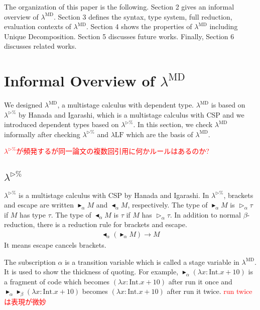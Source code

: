 \documentclass[runningheads]{llncs}
\newcommand{\red}[1]{\textcolor{red}{#1 }}
\newcommand{\LTP}{$\lambda^{\triangleright\%}$\xspace}
\newcommand{\LMD}{$\lambda^{\textrm{MD}}$\xspace}
\newcommand{\LLF}{$\lambda\textrm{LF}$\xspace}
\newcommand{\TW}{\triangleright}
\newcommand{\TB}{\blacktriangleright}
\newcommand{\TBL}{\blacktriangleleft}
\newcommand{\I}{\textrm{Int}}
\begin{document}
The organization of this paper is the following.
Section 2 gives an informal overview of \LMD.
Section 3 defines the syntax, type system, full reduction, evaluation contexts of \LMD.
Section 4 shows the properties of \LMD including Unique Decomposition.
Section 5 discusses future works.
Finally, Section 6 discusses related works.

\section{Informal Overview of \LMD}

We designed \LMD, a multistage calculus with dependent type.
\LMD is based on \LTP\cite{Hanada2014} by Hanada and Igarashi, which is a multistage calculus with CSP and
we introduced dependent types based on \LTP\cite{attapl}.
In this section, we check \LMD informally after checking \LTP and \LLF which are the basis of \LMD.

\red{\LTP\cite{Hanada2014}が頻発するが同一論文の複数回引用に何かルールはあるのか?}
\subsection{\LTP}


\LTP\cite{Hanada2014} is a multistage calculus with CSP by Hanada and Igarashi.
In \LTP, brackets and escape are written $\TB_\alpha M$ and $\TBL_\alpha M$, respectively.
The type of $\TB_\alpha M$ is $\TW_\alpha \tau$ if $M$ has type $\tau$.
The type of $\TBL_\alpha M$ is $\tau$ if $M$ has $\TW_\alpha \tau$.
In addition to normal $\beta$-reduction, there is a reduction rule for brackets and escape.
\begin{align*}
    \TBL_\alpha (\TB_\alpha M) \longrightarrow M
\end{align*}
It means escape cancels brackets.


The subscription $\alpha$ is a transition variable which is called a stage variable in \LMD.
It is used to show the thickness of quoting.
For example, $\TB_\alpha (\lambda x:\I.x+10)$ is a fragment of code which becomes $(\lambda x:\I.x+10)$ after run it once and
$\TB_\alpha \TB_\beta (\lambda x:\I.x+10)$ becomes $(\lambda x:\I.x+10)$ after run it twice.
\red{run twiceは表現が微妙}
\end{document}
